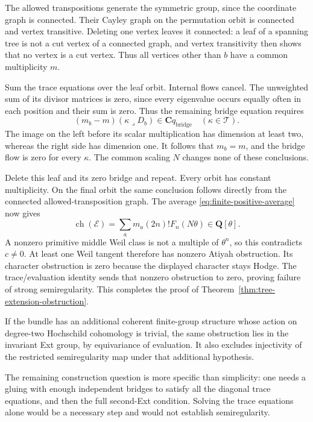 \documentclass[11pt]{article}
\theoremstyle{definition}
\theoremstyle{remark}
\begin{document}
The allowed transpositions generate the symmetric group, since
the coordinate graph is connected.  Their Cayley graph on the
permutation orbit is connected and vertex transitive.  Deleting
one vertex leaves it connected: a leaf of a spanning tree is not
a cut vertex of a connected graph, and vertex transitivity then
shows that no vertex is a cut vertex.
Thus all vertices other than $b$ have a common multiplicity $m$.

Sum the trace equations over the leaf orbit.  Internal flows cancel.
The unweighted sum of its divisor matrices is zero, since every
eigenvalue occurs equally often in each position and their sum
is zero.  Thus the remaining bridge equation requires
\[
 (m_b-m)(\kappa\lrcorner D_b)\in\mathbf Cq_{\mathrm{bridge}}
                       \quad(\kappa\in\mathcal T).
\]
The image on the left before its scalar multiplication has
dimension at least two, whereas the right side has dimension one.
It follows that $m_b=m$, and the bridge flow is zero for every
$\kappa$.  The common scaling $N$ changes none of these conclusions.

Delete this leaf and its zero bridge and repeat.  Every orbit has
constant multiplicity.  On the final orbit the same conclusion
follows directly from the connected allowed-transposition graph.
The average \eqref{eq:finite-positive-average} now gives
\[
 \operatorname{ch}(\mathcal E)
  =\sum_a m_a(2n)!F_n(N\theta)\in\mathbf Q[\theta].
\]
A nonzero primitive middle Weil class is not a multiple of
$\theta^n$, so this contradicts $c\ne0$.
At least one Weil tangent therefore has nonzero Atiyah obstruction.
Its character obstruction is zero because the displayed character
stays Hodge.  The trace/evaluation identity sends that nonzero
obstruction to zero, proving failure of strong semiregularity.
This completes the proof of
Theorem~\ref{thm:tree-extension-obstruction}.

If the bundle has an additional coherent finite-group structure
whose action on degree-two Hochschild cohomology is trivial, the same
obstruction lies in the invariant Ext group, by equivariance of
evaluation.  It also excludes injectivity of the restricted
semiregularity map under that additional hypothesis.

The remaining construction question is more specific than simplicity:
one needs a gluing with enough independent bridges to satisfy all
the diagonal trace equations, and then the full second-Ext condition.
Solving the trace equations alone would be a necessary step and would
not establish semiregularity.
\end{document}
